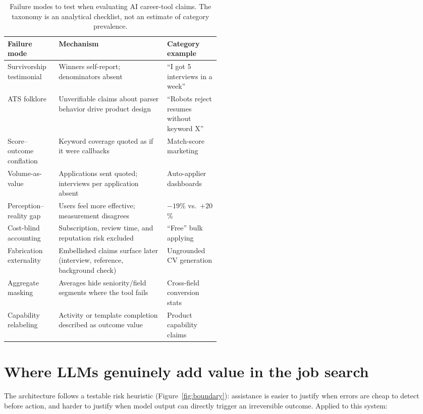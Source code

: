 \documentclass[11pt]{article}
\begin{document}
\begin{table}[ht]
\centering
\footnotesize
\begin{tabularx}{\linewidth}{p{0.24\linewidth}X p{0.25\linewidth}}
\toprule
\textbf{Failure mode} & \textbf{Mechanism} & \textbf{Category example} \\
\midrule
Survivorship testimonial & Winners self-report; denominators absent & ``I got 5 interviews in a week'' \\
ATS folklore & Unverifiable claims about parser behavior drive product design & ``Robots reject resumes without keyword X'' \\
Score--outcome conflation & Keyword coverage quoted as if it were callbacks & Match-score marketing \\
Volume-as-value & Applications sent quoted; interviews per application absent & Auto-applier dashboards \\
Perception--reality gap & Users feel more effective; measurement disagrees & $-19$\% vs.\ $+20$\%~\citep{becker2025metr} \\
Cost-blind accounting & Subscription, review time, and reputation risk excluded & ``Free'' bulk applying \\
Fabrication externality & Embellished claims surface later (interview, reference, background check) & Ungrounded CV generation \\
Aggregate masking & Averages hide seniority/field segments where the tool fails & Cross-field conversion stats \\
Capability relabeling & Activity or template completion described as outcome value & Product capability claims \\
\bottomrule
\end{tabularx}
\caption{Failure modes to test when evaluating AI career-tool claims. The
taxonomy is an analytical checklist, not an estimate of category prevalence.}
\label{tab:taxonomy}
\end{table}

\section{Where LLMs genuinely add value in the job search}
\label{sec:recommendations}

The architecture follows a testable risk heuristic (Figure~\ref{fig:boundary}):
assistance is easier to justify when errors are cheap to detect before action,
and harder to justify when model output can directly trigger an irreversible
outcome. Applied to this system:
\end{document}

